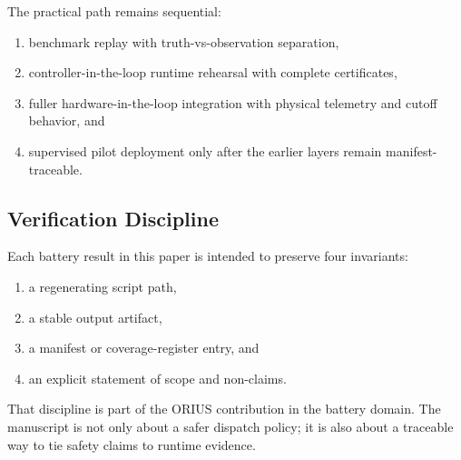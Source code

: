 The practical path remains sequential:
\begin{enumerate}[leftmargin=*,topsep=2pt,itemsep=1pt]
  \item benchmark replay with truth-vs-observation separation,
  \item controller-in-the-loop runtime rehearsal with complete certificates,
  \item fuller hardware-in-the-loop integration with physical telemetry and
    cutoff behavior, and
  \item supervised pilot deployment only after the earlier layers remain
    manifest-traceable.
\end{enumerate}

\subsection{Verification Discipline}

Each battery result in this paper is intended to preserve four invariants:
\begin{enumerate}[leftmargin=*,topsep=2pt,itemsep=1pt]
  \item a regenerating script path,
  \item a stable output artifact,
  \item a manifest or coverage-register entry, and
  \item an explicit statement of scope and non-claims.
\end{enumerate}

That discipline is part of the ORIUS contribution in the battery domain.  The
manuscript is not only about a safer dispatch policy; it is also about a
traceable way to tie safety claims to runtime evidence.

